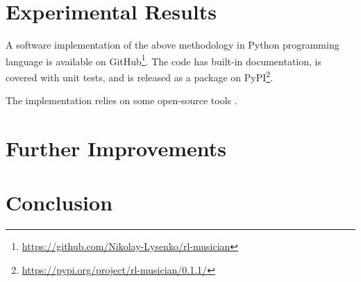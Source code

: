 \documentclass{article}
\begin{document}
\section{Experimental Results}
\label{sec:results}

A software implementation of the above methodology in Python programming language is available on GitHub\footnote{\url{https://github.com/Nikolay-Lysenko/rl-musician}}. The code has built-in documentation, is covered with unit tests, and is released as a package on PyPI\footnote{\url{https://pypi.org/project/rl-musician/0.1.1/}}.


The implementation relies on some open-source tools \cite{brockman2016openai,chollet2015keras,oliphant2006guide,raffel2014intuitive,dong2018pypianoroll}.


\section{Further Improvements}
\label{sec:improvements}


\section{Conclusion}
\label{sec:conclusion}


  

\end{document}
